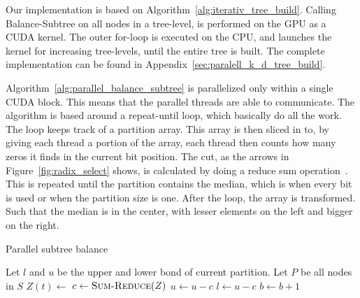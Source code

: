 Our implementation is based on Algorithm~\ref{alg:iterativ_tree_build}. Calling Balance-Subtree on all nodes in a tree-level, is performed on the GPU as a CUDA kernel. The outer for-loop is executed on the CPU, and launches the kernel for increasing tree-levels, until the entire tree is built. The complete implementation can be found in Appendix~\ref{sec:paralell_k_d_tree_build}.

Algorithm~\ref{alg:parallel_balance_subtree} is parallelized only within a single CUDA block. This means that the parallel threads are able to communicate. The algorithm is based around a repeat-until loop, which basically do all the work. The loop keeps track of a partition array. This array is then sliced in to, by giving each thread a portion of the array, each thread then counts how many zeros it finds in the current bit position. The cut, as the arrows in Figure~\ref{fig:radix_select} shows, is calculated by doing a reduce sum operation~\citep{parallel_reduction_in_cuda}. This is repeated until the partition contains the median, which is when every bit is used or when the partition size is one. After the loop, the array is transformed. Such that the median is in the center, with lesser elements on the left and bigger on the right.

\begin{algorithm}[ht]
\caption{Parallel subtree balance}
\label{alg:parallel_balance_subtree}
\begin{algorithmic}
        \State Let $l$ and $u$ be the upper and lower bond of current partition.
        \State Let $P$ be all nodes in $S$
        \Repeat
                \State $Z(t) \gets $  
            \EndFor
            \State $c \gets \Call{Sum-Reduce}{Z}$ 
                \State$ u \gets u-c$
            \Else
                \State$l \gets u-c$
            \EndIf
            \State $b \gets b+1$ 
            \State {}
        \State {}
    \EndFunction
\end{algorithmic}
\end{algorithm}

